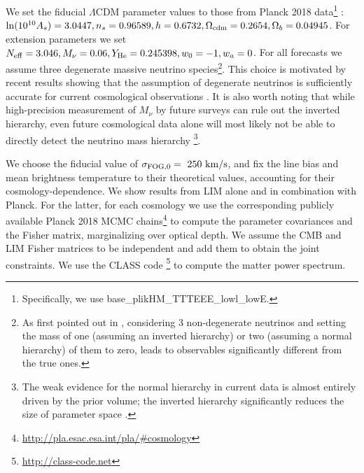 \documentclass[twocolumn]{aastex631}
\begin{document}
We set the fiducial $\Lambda$CDM  parameter values to those from Planck 2018 data\footnote{Specifically, we use \textsf{ base\_plikHM\_TTTEEE\_lowl\_lowE}.} \citep{Aghanim:2018eyx}: ${\rm ln} (10^{10}A_s) = 3.0447, n_s = 0.96589, h = 0.6732,\Omega_{\rm cdm} =0.2654,  \Omega_b = 0.04945$. For extension parameters we set $N_{\rm eff} = 3.046, M_\nu = 0.06, Y_{\rm He} = 0.245398, w_0 = -1, w_a = 0$. For all forecasts we assume three degenerate massive neutrino species\footnote{As first pointed out in \cite{Lesgourgues:2004ps}, considering 3 non-degenerate neutrinos and setting the mass of one (assuming an inverted hierarchy) or two (assuming a normal hierarchy) of them to zero, leads to observables significantly different from the true ones.}. This choice is motivated by recent results showing that the assumption of degenerate neutrinos is sufficiently accurate for current cosmological observations \citep{RoyChoudhury:2019hls}. It is also worth noting that while high-precision measurement of $M_\nu$ by future surveys can rule out the inverted hierarchy, even future cosmological data alone will most likely not be able to directly detect the neutrino mass hierarchy \citep{Archidiacono:2020dvx}\footnote{The weak evidence for the normal hierarchy in current data is almost entirely driven by the prior volume; the inverted hierarchy significantly reduces the size of parameter space \citep{Hall:2012kg}.}. 

We choose the fiducial value of $\sigma_{{\rm FOG},0} = \ 250 \ {\rm km}/{\rm s}$, and fix the line bias and mean brightness temperature to their theoretical values, accounting for their cosmology-dependence. We show results from LIM alone and in combination with Planck. For the latter, for each cosmology we use the corresponding publicly available Planck 2018 MCMC chains\footnote{\url{http://pla.esac.esa.int/pla/\#cosmology}} to compute the parameter covariances and the Fisher matrix, marginalizing over optical depth. We assume the CMB and LIM Fisher matrices to be independent and add them to obtain the joint constraints. We use the CLASS code \citep{Blas:2011rf}\footnote{\url{http://class-code.net}} to compute the matter power spectrum.
\end{document}
